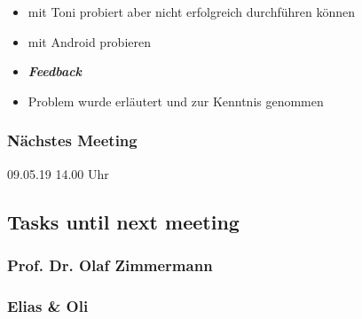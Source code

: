 \begin{itemize}
\item mit Toni probiert aber nicht erfolgreich durchführen können
\item mit Android probieren 
\item \emph{\textbf{Feedback}}
\item Problem wurde erläutert und zur Kenntnis genommen
\end{itemize}

\hypertarget{nuxe4chstes-meeting}{%
\subsubsection*{Nächstes Meeting}\label{nuxe4chstes-meeting}}

09.05.19 14.00 Uhr

\hypertarget{tasks-until-next-meeting}{%
\subsection*{Tasks until next meeting}\label{tasks-until-next-meeting}}

\hypertarget{prof-dr-olaf-zimmermann}{%
\subsubsection*{Prof. Dr. Olaf
Zimmermann}\label{prof-dr-olaf-zimmermann}}

\hypertarget{elias--oli}{%
\subsubsection*{Elias \& Oli}\label{elias--oli}}